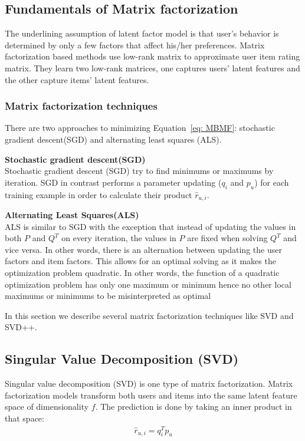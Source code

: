\documentclass[oneside,13pt]{extreport}
\begin{document}
\subsection{Fundamentals of Matrix factorization}
The underlining assumption of latent factor model is that user’s behavior is determined by only a few factors that affect his/her preferences. Matrix factorization based methods use low-rank matrix
to approximate user item rating matrix. They learn two low-rank matrices, one captures users’ latent features and the other capture items’ latent features.
\subsubsection{Matrix factorization techniques}
There are two approaches to minimizing Equation~\ref{eq: MBMF}: stochastic
gradient descent(SGD) and alternating least squares (ALS).
\begin{description}
    \item{\textbf{Stochastic gradient descent(SGD)}} 
    \\Stochastic gradient descent (SGD) try to find minimums or maximums by iteration. SGD in contrast performs a parameter updating ($q_i$ and $p_u$) for each training example in order to calculate their product $\hat r_{u,i}$.
    \item{\textbf{Alternating Least Squares(ALS)}}
    \\ALS is similar to SGD with the exception that instead of updating the values
in both $P$ and $Q^T$ on every iteration, the values in $P$ are fixed when solving $Q^T$
and vice versa. In other words, there is an alternation between updating the
user factors and item factors. This allows for an optimal solving as it makes the
optimization problem quadratic. In other words, the function of a quadratic
optimization problem has only one maximum or minimum hence no other local
maximums or minimums to be misinterpreted as optimal
\end{description}

In this section we describe several matrix factorization techniques like SVD and SVD++.

\subsection{Singular Value Decomposition (SVD)}
Singular value decomposition (SVD) is one type of matrix factorization. Matrix factorization models transform both users and items into the same latent feature space of dimensionality $f$. The prediction is done by taking an inner product in that space: 
\begin{eqnarray}
\label{eq:MF_predict}
{\hat r_{u,i}} = q_i^T{p_u} 
\end{eqnarray}
\end{document}

